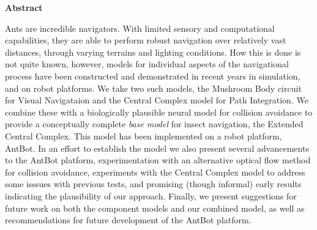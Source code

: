 \documentclass[a4paper,11pt,twoside,openright]{article}
\begin{document}
\centering
{\LARGE\textbf{Abstract}}
\begin{flushleft}
  {\small Ants are incredible navigators. With limited sensory and
    computational capabilities, they are able to perform robust
    navigation over relatively vast distances, through varying
    terrains and lighting conditions. How this is done is not quite
    known, however, models for individual aspects of the navigational
    process have been constructed and demonstrated in recent years in
    simulation, and on robot platforms.  We take two such models, the
    Mushroom Body circuit for Visual Navigataion and the Central
    Complex model for Path Integration. We combine these with a
    biologically plausible neural model for collision avoidance to
    provide a conceptually complete \textit{base model} for insect
    navigation, the Extended Central Complex. This model has been
    implemented on a robot platform, AntBot. In an effort to establish
    the model we also present several advancements to the AntBot
    platform, experimentation with an alternative optical flow method
    for collision avoidance, experiments with the Central Complex
    model to address some isssues with previous tests, and promising
    (though informal) early results indicating the plausibility of our
    approach. Finally, we present suggestions for future work on both
    the component models and our combined model, as well as
    recommendations for future development of the AntBot platform.}
\end{flushleft}
\newpage

\tableofcontents
\newpage

\listoffigures
\newpage

\listoftables
\newpage
\thispagestyle{empty}
\mbox{}
\newpage
\end{document}
